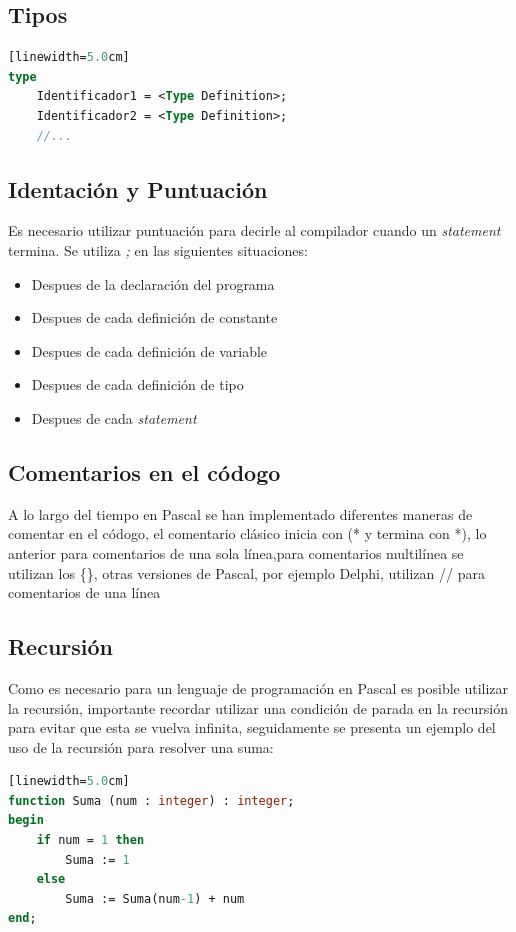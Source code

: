 \documentclass[10pt,journal,compsoc]{IEEEtran}
\begin{document}
\subsection{Tipos}
\begin{lstlisting}[language=Pascal, caption = {Declaraci\'on de Tipos}][linewidth=5.0cm]
type
	Identificador1 = <Type Definition>;
	Identificador2 = <Type Definition>;
	//...
\end{lstlisting}

\subsection{Identaci\'on y Puntuaci\'on}
Es necesario utilizar puntuaci\'on para decirle al compilador cuando un \emph{statement} termina. Se utiliza \emph{;} en las siguientes situaciones:
\begin{itemize}
	\item Despues de la declaraci\'on del programa
	\item Despues de cada definici\'on de constante
	\item Despues de cada definici\'on de variable
	\item Despues de cada definici\'on de tipo
	\item Despues de cada \emph{statement}
\end{itemize}

\subsection{Comentarios en el c\'odogo}
A lo largo del tiempo en Pascal se han implementado diferentes maneras de comentar en el c\'odogo, el comentario cl\'asico inicia con (* y termina con *), lo anterior para comentarios de una sola l\'inea,para comentarios multil\'inea se utilizan los \{\}, otras versiones de Pascal, por ejemplo Delphi, utilizan // para comentarios de una l\'inea 

\subsection{Recursi\'on}
Como es necesario para un lenguaje de programaci\'on en Pascal es posible utilizar la recursi\'on, importante recordar utilizar una condici\'on de parada en la recursi\'on para evitar que esta se vuelva infinita, seguidamente se presenta un ejemplo del uso de la recursi\'on para resolver una suma:
\begin{lstlisting}[language=Pascal, caption = {Recursi\'on en Pascal}][linewidth=5.0cm]
function Suma (num : integer) : integer;
begin
	if num = 1 then 
		Suma := 1
	else 
		Suma := Suma(num-1) + num
end;
\end{lstlisting}
\end{document}
